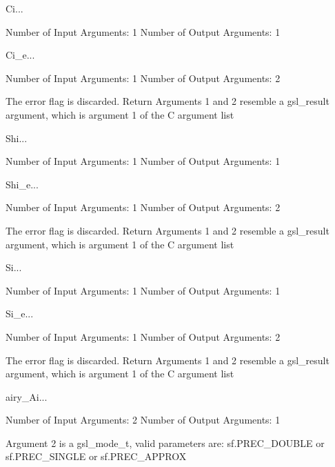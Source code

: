 \begin{funcdesc}{Ci}{...}

    Number of Input  Arguments:  1
    Number of Output Arguments:  1
\end{funcdesc}

\begin{funcdesc}{Ci_e}{...}

    Number of Input  Arguments:  1
    Number of Output Arguments:  2

The error flag is discarded.
Return Arguments 1 and 2 resemble a gsl_result argument,
	which is  argument 1 of the C argument list

\end{funcdesc}

\begin{funcdesc}{Shi}{...}

    Number of Input  Arguments:  1
    Number of Output Arguments:  1
\end{funcdesc}

\begin{funcdesc}{Shi_e}{...}

    Number of Input  Arguments:  1
    Number of Output Arguments:  2

The error flag is discarded.
Return Arguments 1 and 2 resemble a gsl_result argument,
	which is  argument 1 of the C argument list

\end{funcdesc}

\begin{funcdesc}{Si}{...}

    Number of Input  Arguments:  1
    Number of Output Arguments:  1
\end{funcdesc}

\begin{funcdesc}{Si_e}{...}

    Number of Input  Arguments:  1
    Number of Output Arguments:  2

The error flag is discarded.
Return Arguments 1 and 2 resemble a gsl_result argument,
	which is  argument 1 of the C argument list

\end{funcdesc}

\begin{funcdesc}{airy_Ai}{...}

    Number of Input  Arguments:  2
    Number of Output Arguments:  1

 Argument 2 is a gsl_mode_t, valid parameters are:
	sf.PREC_DOUBLE or sf.PREC_SINGLE or sf.PREC_APPROX

\end{funcdesc}

